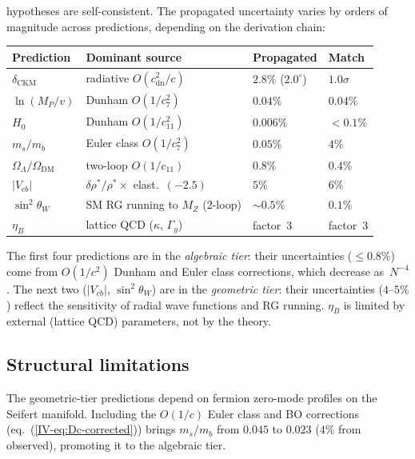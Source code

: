 hypotheses are self-consistent.
The propagated uncertainty varies by orders of magnitude
across predictions, depending on the derivation chain:
\begin{center}\small
\begin{tabular}{llll}
\toprule
Prediction & Dominant source & Propagated & Match \\
\midrule
$\delta_{\mathrm{CKM}}$
  & radiative $O(c_{\mathrm{dn}}^2/c)$
  & $2.8\%$ ($2.0^\circ$) & $1.0\sigma$ \\
$\ln(M_P/v)$
  & Dunham $O(1/c_7^2)$
  & $0.04\%$ & $0.04\%$ \\
$H_0$
  & Dunham $O(1/c_{11}^2)$
  & $0.006\%$ & $< 0.1\%$ \\
$m_s/m_b$
  & Euler class $O(1/c_7^2)$
  & $0.05\%$ & $4\%$ \\
$\Omega_\Lambda/\Omega_{\mathrm{DM}}$
  & two-loop $O(1/c_{11})$
  & $0.8\%$ & $0.4\%$ \\
$|V_{cb}|$
  & $\delta\rho^*/\rho^* \times$ elast.\ $({-}2.5)$
  & $5\%$ & $6\%$ \\
$\sin^2\theta_W$
  & SM RG running to $M_Z$ (2-loop)
  & ${\sim}0.5\%$ & $0.1\%$ \\
$\eta_B$
  & lattice QCD ($\kappa$, $\Gamma_y$)
  & factor~$3$ & factor~$3$ \\
\bottomrule
\end{tabular}
\end{center}

\medskip
The first four predictions are in the \emph{algebraic tier}:
their uncertainties ($\le 0.8\%$) come from
$O(1/c^2)$ Dunham and Euler class corrections,
which decrease as~$N^{-4}$.
The next two ($|V_{cb}|$, $\sin^2\theta_W$) are in the
\emph{geometric tier}: their uncertainties ($4$--$5\%$)
reflect the sensitivity of radial wave functions and
RG running.
$\eta_B$ is limited by external (lattice QCD)
parameters, not by the theory.

\subsection{Structural limitations}
The geometric-tier predictions depend on fermion
zero-mode profiles on the Seifert manifold.
Including the $O(1/c)$ Euler class and BO corrections
(eq.~(\ref*{IV-eq:Dc-corrected})) brings $m_s/m_b$
from $0.045$ to $0.023$ ($4\%$ from observed),
promoting it to the algebraic tier.

